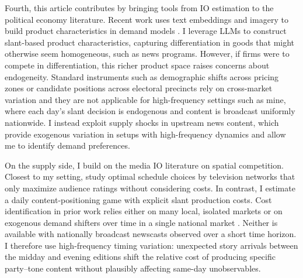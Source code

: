 \documentclass[12pt]{article}
\begin{document}

Fourth, this article contributes by bringing tools from IO estimation to the political economy literature. Recent work uses text embeddings and imagery to build product characteristics in demand models \citep{compiani2025demandestimationtextimage}. I leverage LLMs to construct slant-based product characteristics, capturing differentiation in goods that might otherwise seem homogeneous, such as news programs. However, if firms were to compete in differentiation, this richer product space raises concerns about endogeneity. Standard instruments such as demographic shifts across pricing zones \citep{fan} or candidate positions across electoral precincts \citep{longuet-marx2025party} rely on cross-market variation and they are not applicable for high-frequency settings such as mine,  where each day’s slant decision is endogenous and content is broadcast uniformly nationwide. I instead exploit supply shocks in upstream news content, which provide exogenous variation in setups with high-frequency dynamics and allow me to identify demand preferences. 



On the supply side, I build on the media IO literature on spatial competition. Closest to my setting, \citet{Goettler2001SpatialCI} study optimal schedule choices by television networks that only maximize audience ratings without considering costs. In contrast, I estimate a daily content-positioning game with explicit slant production costs. Cost identification in prior work relies either on many local, isolated markets \citep[e.g.,][]{Draganska2008BeyondPV,fan} or on exogenous demand shifters over time in a single national market \citep{Wollmann2018TrucksWB}. Neither is available with nationally broadcast  newscasts observed over a short time horizon. I therefore use high-frequency timing variation: unexpected story arrivals between the midday and evening editions shift the relative cost of producing specific party–tone content without plausibly affecting same-day unobservables. 
\end{document}
